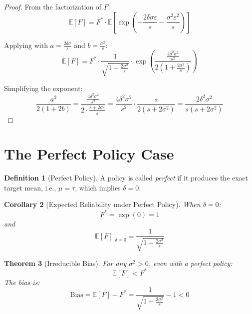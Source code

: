 \documentclass[11pt,a4paper]{article}
\newtheorem{theorem}{Theorem}
\newtheorem{corollary}[theorem]{Corollary}
\theoremstyle{definition}
\newtheorem{definition}[theorem]{Definition}
\newcommand{\E}{\mathbb{E}}
\begin{document}
\begin{proof}
From the factorization of $F$:
\begin{equation}
    \E[F] = F^* \cdot \E\left[\exp\left(-\frac{2\delta\sigma\varepsilon}{s} - \frac{\sigma^2\varepsilon^2}{s}\right)\right]
\end{equation}

Applying  with $a = \frac{2\delta\sigma}{s}$ and $b = \frac{\sigma^2}{s}$:
\begin{equation}
    \E[F] = F^* \cdot \frac{1}{\sqrt{1 + \frac{2\sigma^2}{s}}} \cdot \exp\left(\frac{\frac{4\delta^2\sigma^2}{s^2}}{2\left(1 + \frac{2\sigma^2}{s}\right)}\right)
\end{equation}

Simplifying the exponent:
\begin{equation}
    \frac{a^2}{2(1 + 2b)} = \frac{\frac{4\delta^2\sigma^2}{s^2}}{2 \cdot \frac{s + 2\sigma^2}{s}} = \frac{4\delta^2\sigma^2}{s^2} \cdot \frac{s}{2(s + 2\sigma^2)} = \frac{2\delta^2\sigma^2}{s(s + 2\sigma^2)}
\end{equation}
\end{proof}

\section{The Perfect Policy Case}

\begin{definition}[Perfect Policy]
A policy is called \emph{perfect} if it produces the exact target mean, i.e., $\mu = \tau$, which implies $\delta = 0$.
\end{definition}

\begin{corollary}[Expected Reliability under Perfect Policy]
\label{cor:perfect-policy}
When $\delta = 0$:
\begin{equation}
    F^* = \exp(0) = 1
\end{equation}
and
\begin{equation}
    \E[F]\big|_{\delta=0} = \frac{1}{\sqrt{1 + \frac{2\sigma^2}{s}}}
\end{equation}
\end{corollary}

\begin{theorem}[Irreducible Bias]
\label{thm:irreducible-bias}
For any $\sigma^2 > 0$, even with a perfect policy:
\begin{equation}
    \E[F] < F^*
\end{equation}
The bias is:
\begin{equation}
    \mathrm{Bias} = \E[F] - F^* = \frac{1}{\sqrt{1 + \frac{2\sigma^2}{s}}} - 1 < 0
\end{equation}
\end{theorem}
\end{document}
